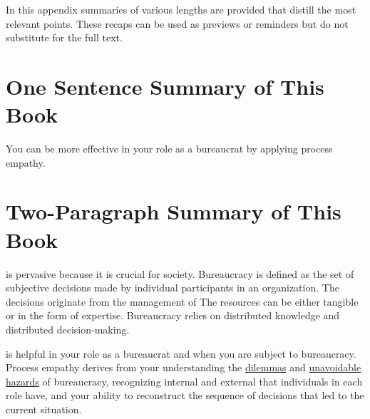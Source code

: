 In this appendix summaries of various lengths are provided that distill the most relevant points. These recaps can be used as previews or reminders but do not substitute for the full text.

\section*{One Sentence Summary of This Book}

You can be more effective in your role as a \gls{bureaucrat} by applying \gls{process empathy}.

\newpage

\section*{Two-Paragraph Summary of This Book}


\iftoggle{glossarysubstitutionworks}{\Gls{bureaucracy}}{Bureaucracy} is pervasive because it is crucial for society. Bureaucracy is defined as the set of subjective decisions made by individual participants in an organization. The decisions originate from the 
management of \iftoggle{glossarysubstitutionworks}{\glspl{shared resource}.}{shared resources.} 
The resources can be either tangible or in the form of expertise. Bureaucracy relies on
distributed knowledge and distributed decision-making.

\iftoggle{glossarysubstitutionworks}{\Gls{process empathy}}{Process empathy} 
is helpful in your role as a bureaucrat and when you are subject to bureaucracy. 
Process empathy derives from your understanding the \hyperref[sec:dilemma-trilemma]{dilemmas} and \hyperref[sec:unavoidable-hazards]{unavoidable hazards} of bureaucracy, recognizing internal
\iftoggle{glossarysubstitutionworks}{\glspl{motive}}{motives} and external 
\iftoggle{glossarysubstitutionworks}{\glspl{incentive}}{incentives}
 that individuals in each role have, and your ability to reconstruct the sequence of decisions that led to the current situation. 





